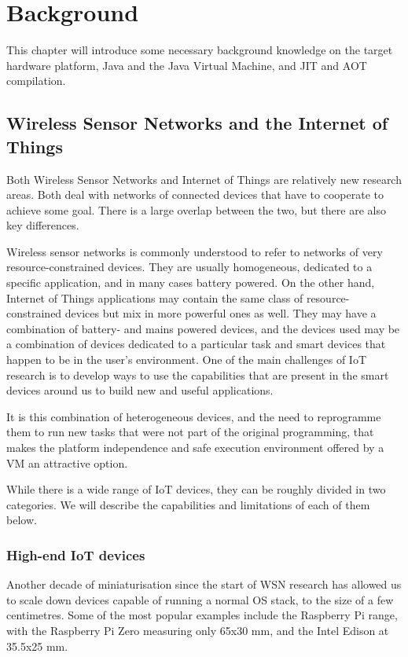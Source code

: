 \chapter{Background}
This chapter will introduce some necessary background knowledge on the target hardware platform, Java and the Java Virtual Machine, and JIT and AOT compilation.

\section{Wireless Sensor Networks and the Internet of Things}
Both Wireless Sensor Networks and Internet of Things are relatively new research areas. Both deal with networks of connected devices that have to cooperate to achieve some goal. There is a large overlap between the two, but there are also key differences.

Wireless sensor networks is commonly understood to refer to networks of very resource-constrained devices. They are usually homogeneous, dedicated to a specific application, and in many cases battery powered. On the other hand, Internet of Things applications may contain the same class of resource-constrained devices but mix in more powerful ones as well. They may have a combination of battery- and mains powered devices, and the devices used may be a combination of devices dedicated to a particular task and smart devices that happen to be in the user's environment. One of the main challenges of IoT research is to develop ways to use the capabilities that are present in the smart devices around us to build new and useful applications.

It is this combination of heterogeneous devices, and the need to reprogramme them to run new tasks that were not part of the original programming, that makes the platform independence and safe execution environment offered by a VM an attractive option.

While there is a wide range of IoT devices, they can be roughly divided in two categories. We will describe the capabilities and limitations of each of them below. 


\subsection{High-end IoT devices}
Another decade of miniaturisation since the start of WSN research has allowed us to scale down devices capable of running a normal OS stack, to the size of a few centimetres. Some of the most popular examples include the Raspberry Pi range, with the Raspberry Pi Zero measuring only 65x30 mm, and the Intel Edison at 35.5x25 mm.

